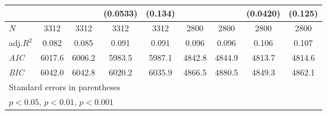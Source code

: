 \documentclass[12pt,a4paper]{article}
\begin{document}
\begin{table}[htbp]
\begin{tabular}{l*{8}{c}}
&&&(0.0533)&(0.134)&&&(0.0420)&(0.125)\\
\hline
\(N\)&3312&3312&3312&3312&2800&2800&2800&2800\\
adj.\(R^{2}\)&0.082&0.085&0.091&0.091&0.096&0.096&0.106&0.107\\
\textit{AIC}&6017.6&6006.2&5983.5&5987.1&4842.8&4844.9&4813.7&4814.6\\
\textit{BIC}&6042.0&6042.8&6020.2&6035.9&4866.5&4880.5&4849.3&4862.1\\
\hline\hline
\multicolumn{9}{l}{\footnotesize Standard errors in parentheses}\\
\multicolumn{9}{l}{\footnotesize \sym{*} \(p<0.05\), \sym{**} \(p<0.01\), \sym{***} \(p<0.001\)}\\
\end{tabular}
\end{table}
\end{document}
